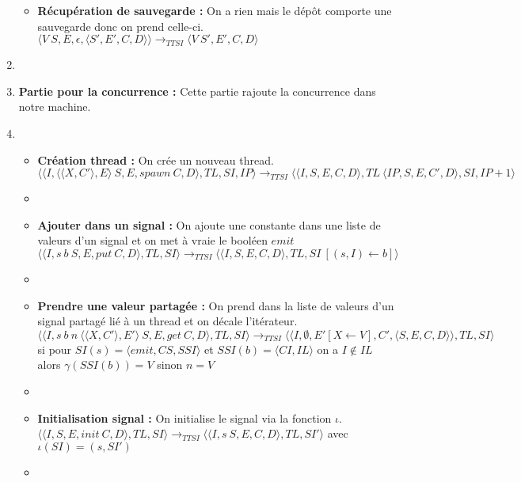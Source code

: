 \documentclass[10pt,a4paper]{article}
\begin{document}
\begin{enumerate}
\begin{itemize}
						\item[] \textbf{Récupération de sauvegarde :}  On a rien mais le dépôt comporte une sauvegarde donc on prend celle-ci.
						\smallbreak  
						$\langle V~S,E,\epsilon,\langle S',E',C,D\rangle\rangle
						\longrightarrow_{TTSI} 
						\langle V~S',E',C,D\rangle$
					\end{itemize}
					\item[]
					
					
					
					\item[] \textbf{Partie pour la concurrence :} Cette partie rajoute la concurrence dans notre machine. 
					\item[]
					\begin{itemize}
						\item[]  \textbf{Création thread :} On crée un nouveau thread.
						\smallbreak 
						$\langle\langle I,\langle\langle X,C'\rangle, E\rangle~S,E,spawn~C,D\rangle,TL,SI,IP\rangle 
						\longrightarrow_{TTSI} 
						\langle\langle I,S,E,C,D\rangle,TL~\langle IP,S,E,C',D\rangle,SI,IP+1\rangle$
						\item[]
						
						\item[] \textbf{Ajouter dans un signal :} On ajoute une constante dans une liste de valeurs d'un signal et on met à vraie le booléen $emit$
						\smallbreak
						$\langle\langle I,s~b~S,E,put~C,D\rangle,TL,SI\rangle
						\longrightarrow_{TTSI} 
						\langle\langle I,S,E,C,D\rangle,TL,SI~[(s,I) \leftarrow b]\rangle$ 
						\item[]
						
						\item[] \textbf{Prendre une valeur partagée :} On prend dans la liste de valeurs d'un signal partagé lié à un thread et on décale l'itérateur.
						\smallbreak
						$\langle\langle I,s~b~n~\langle\langle X,C'\rangle,E'\rangle~S,E,get~C,D\rangle,TL,SI\rangle 
						\longrightarrow_{TTSI} 
						\langle\langle I,\emptyset,E'[X \leftarrow V],C',\langle S,E,C,D\rangle\rangle,TL,SI\rangle$
						\\ si pour $SI(s) = \langle emit,CS,SSI\rangle$ et $SSI(b) = \langle CI,IL\rangle$ on a $I \notin IL$ alors $\gamma(SSI(b)) = V$ sinon $n = V$
						\item[]
						
						\item[] \textbf{Initialisation signal :} On initialise le signal via la fonction $\iota$.
						\smallbreak 
						$\langle\langle I,S,E,init~C,D\rangle,TL,SI\rangle 
						\longrightarrow_{TTSI}
						\langle\langle I,s~S,E,C,D\rangle,TL,SI'\rangle$
						avec $\iota(SI) = (s,SI')$
						\item[]	
						

\end{itemize}
\end{enumerate}
\end{document}
